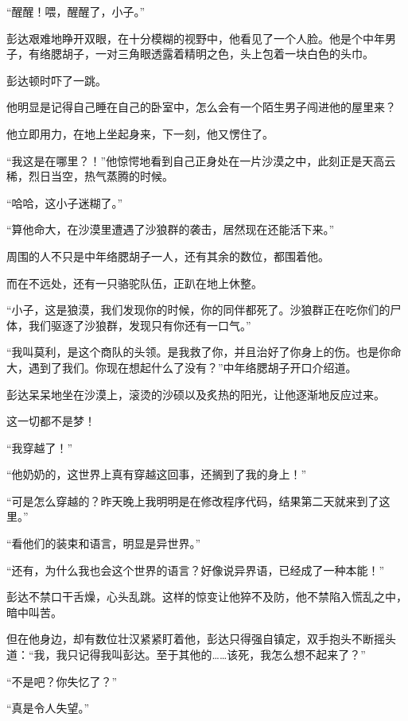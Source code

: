 
\begin{this_body}

“醒醒！喂，醒醒了，小子。”

彭达艰难地睁开双眼，在十分模糊的视野中，他看见了一个人脸。他是个中年男子，有络腮胡子，一对三角眼透露着精明之色，头上包着一块白色的头巾。

彭达顿时吓了一跳。

他明显是记得自己睡在自己的卧室中，怎么会有一个陌生男子闯进他的屋里来？

他立即用力，在地上坐起身来，下一刻，他又愣住了。

“我这是在哪里？！”他惊愕地看到自己正身处在一片沙漠之中，此刻正是天高云稀，烈日当空，热气蒸腾的时候。

“哈哈，这小子迷糊了。”

“算他命大，在沙漠里遭遇了沙狼群的袭击，居然现在还能活下来。”

周围的人不只是中年络腮胡子一人，还有其余的数位，都围着他。

而在不远处，还有一只骆驼队伍，正趴在地上休整。

“小子，这是狼漠，我们发现你的时候，你的同伴都死了。沙狼群正在吃你们的尸体，我们驱逐了沙狼群，发现只有你还有一口气。”

“我叫莫利，是这个商队的头领。是我救了你，并且治好了你身上的伤。也是你命大，遇到了我们。你现在想起什么了没有？”中年络腮胡子开口介绍道。

彭达呆呆地坐在沙漠上，滚烫的沙硕以及炙热的阳光，让他逐渐地反应过来。

这一切都不是梦！

“我穿越了！”

“他奶奶的，这世界上真有穿越这回事，还搁到了我的身上！”

“可是怎么穿越的？昨天晚上我明明是在修改程序代码，结果第二天就来到了这里。”

“看他们的装束和语言，明显是异世界。”

“还有，为什么我也会这个世界的语言？好像说异界语，已经成了一种本能！”

彭达不禁口干舌燥，心头乱跳。这样的惊变让他猝不及防，他不禁陷入慌乱之中，暗中叫苦。

但在他身边，却有数位壮汉紧紧盯着他，彭达只得强自镇定，双手抱头不断摇头道：“我，我只记得我叫彭达。至于其他的……该死，我怎么想不起来了？”

“不是吧？你失忆了？”

“真是令人失望。”


\end{this_body}
